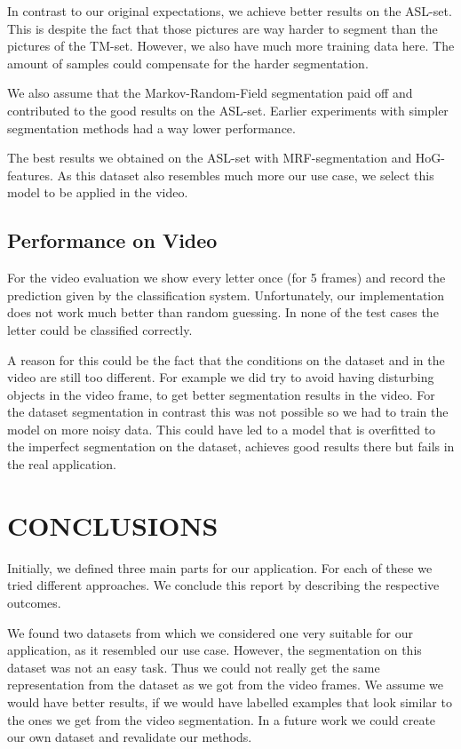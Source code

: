 \documentclass[letterpaper, 10 pt, conference]{ieeeconf}  %
\begin{document}
In contrast to our original expectations, we achieve better results on the ASL-set. This is despite the fact that those pictures are way harder to segment than the pictures of the TM-set. However, we also have much more training data here. The amount of samples could compensate for the harder segmentation.

We also assume that the Markov-Random-Field segmentation paid off and contributed to the good results on the ASL-set. Earlier experiments with simpler segmentation methods had a way lower performance.

The best results we obtained on the ASL-set with MRF-segmentation and HoG-features. As this dataset also resembles much more our use case, we select this model to be applied in the video.

\subsection{Performance on Video}

For the video evaluation we show every letter once (for 5 frames) and record the prediction given by the classification system. Unfortunately, our implementation does not work much better than random guessing. In none of the test cases the letter could be classified correctly.

A reason for this could be the fact that the conditions on the dataset and in the video are still too different. For example we did try to avoid having disturbing objects in the video frame, to get better segmentation results in the video. For the dataset segmentation in contrast this was not possible so we had to train the model on more noisy data. This could have led to a model that is overfitted to the imperfect segmentation on the dataset, achieves good results there but fails in the real application.


\section{CONCLUSIONS}
\label{sec:concl}

Initially, we defined three main parts for our application. For each of these we tried different approaches. We conclude this report by describing the respective outcomes.

We found two datasets from which we considered one very suitable for our application, as it resembled our use case. However, the segmentation on this dataset was not an easy task. Thus we could not really get the same representation from the dataset as we got from the video frames. We assume we would have better results, if we would have labelled examples that look similar to the ones we get from the video segmentation. In a future work we could create our own dataset and revalidate our methods.
\end{document}
